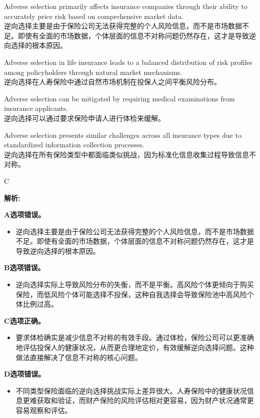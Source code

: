 \documentclass{article}
\newenvironment{explanation}
{\textbf{解析:}\par}
{\par}
\begin{document}
\begin{choices}
    \item Adverse selection primarily affects insurance companies through their ability to accurately price risk based on comprehensive market data.\\
    逆向选择主要是由于保险公司无法获得完整的个人风险信息，而不是市场数据不足。即使有全面的市场数据，个体层面的信息不对称问题仍然存在，这才是导致逆向选择的根本原因。
    \item Adverse selection in life insurance leads to a balanced distribution of risk profiles among policyholders through natural market mechanisms.\\
    逆向选择在人寿保险中通过自然市场机制在投保人之间平衡风险分布。
    \item Adverse selection can be mitigated by requiring medical examinations from insurance applicants.\\
    逆向选择可以通过要求保险申请人进行体检来缓解。
    \item Adverse selection presents similar challenges across all insurance types due to standardized information collection processes.\\
    逆向选择在所有保险类型中都面临类似挑战，因为标准化信息收集过程导致信息不对称。
\end{choices}

\begin{correctanswer}
    C
\end{correctanswer}

\begin{explanation}
    \textbf{A选项错误。}
    \begin{itemize}
        \item 逆向选择主要是由于保险公司无法获得完整的个人风险信息，而不是市场数据不足。即使有全面的市场数据，个体层面的信息不对称问题仍然存在，这才是导致逆向选择的根本原因。
    \end{itemize}

    \textbf{B选项错误。}
    \begin{itemize}
        \item 逆向选择实际上导致风险分布的失衡，而不是平衡。高风险个体更倾向于购买保险，而低风险个体可能选择不投保，这种自我选择会导致保险池中高风险个体比例过高。
    \end{itemize}

    \textbf{C选项正确。}
    \begin{itemize}
        \item 要求体检确实是减少信息不对称的有效手段。通过体检，保险公司可以更准确地评估投保人的健康状况，从而更合理地定价，有效缓解逆向选择问题。这种做法直接解决了信息不对称的核心问题。
    \end{itemize}

    \textbf{D选项错误。}
    \begin{itemize}
        \item 不同类型保险面临的逆向选择挑战实际上差异很大。人寿保险中的健康状况信息更难获取和验证，而财产保险的风险评估相对更容易，因为财产状况通常更容易观察和评估。
    \end{itemize}
\end{explanation}
\end{document}
